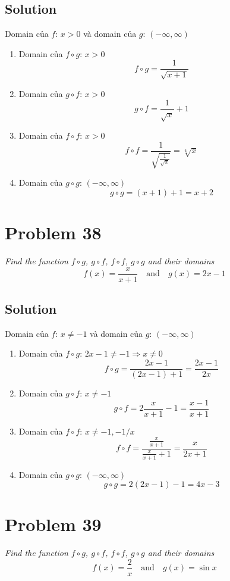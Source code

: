 \documentclass[11pt]{article}
\newcommand{\soln}{\subsection*}
\newcommand{\qn}{\textit}
\begin{document}
\soln{Solution}
Domain của $f$: $x>0$ và domain của $g$: $(-\infty, \infty)$
\begin{enumerate}
	\item Domain của $f \circ g$: $x>0$ $$f \circ g=\frac{1}{\sqrt{x+1}}$$
	
	\item Domain của $g \circ f$: $x>0$ $$g \circ f=\frac{1}{\sqrt{x}}+1$$
	
	\item Domain của $f \circ f$: $x>0$ $$f \circ f=\frac{1}{\sqrt{\frac{1}{\sqrt{x}}}}=\sqrt[4]{x}$$
	
	\item Domain của $g \circ g$: $(-\infty, \infty)$ $$g \circ g=(x+1)+1=x+2$$
\end{enumerate}

\section*{Problem 38}

\qn{Find the function $f \circ g$, $g \circ f$, $f \circ f$, $g \circ g$ and their domains $$f(x)=\frac{x}{x+1} \quad \text{and} \quad g(x)=2x-1$$}

\soln{Solution}
Domain của $f$: $x \ne -1$ và domain của $g$: $(-\infty, \infty)$
\begin{enumerate}
	\item Domain của $f \circ g$: $2x-1 \ne -1 \Rightarrow x \ne 0$ $$f \circ g=\frac{2x-1}{(2x-1)+1}=\frac{2x-1}{2x}$$
	
	\item Domain của $g \circ f$: $x \ne -1$ $$g \circ f=2\frac{x}{x+1}-1=\frac{x-1}{x+1}$$
	
	\item Domain của $f \circ f$: $x \ne -1, -1/x$ $$f \circ f=\frac{\frac{x}{x+1}}{\frac{x}{x+1}+1}=\frac{x}{2x+1}$$
	
	\item Domain của $g \circ g$: $(-\infty, \infty)$ $$g \circ g=2(2x-1)-1=4x-3$$
\end{enumerate}

\section*{Problem 39}

\qn{Find the function $f \circ g$, $g \circ f$, $f \circ f$, $g \circ g$ and their domains $$f(x)=\frac{2}{x} \quad \text{and} \quad g(x)=\sin{x}$$}
\end{document}
